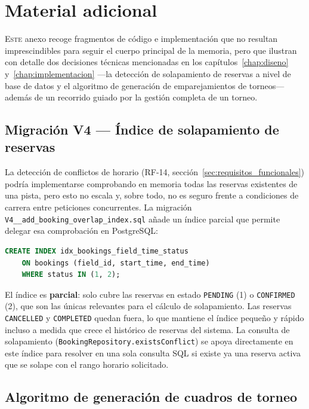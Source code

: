 \chapter{Material adicional}
\label{chap:adicional}

\lettrine{E}{ste} anexo recoge fragmentos de código e implementación que no
resultan imprescindibles para seguir el cuerpo principal de la memoria, pero
que ilustran con detalle dos decisiones técnicas mencionadas en los
capítulos~\ref{chap:diseno} y~\ref{chap:implementacion} —la detección de
solapamiento de reservas a nivel de base de datos y el algoritmo de
generación de emparejamientos de torneos— además de un recorrido guiado por
la gestión completa de un torneo.

\section{Migración V4 — Índice de solapamiento de reservas}
\label{sec:anexo_migracion_v4}

La detección de conflictos de horario (RF-14, sección~\ref{sec:requisitos_funcionales})
podría implementarse comprobando en memoria todas las reservas existentes de
una pista, pero esto no escala y, sobre todo, no es seguro frente a
condiciones de carrera entre peticiones concurrentes. La migración
\texttt{V4\_\_add\_booking\_overlap\_index.sql} añade un índice parcial que
permite delegar esa comprobación en PostgreSQL:

\begin{lstlisting}[language=SQL]
CREATE INDEX idx_bookings_field_time_status
    ON bookings (field_id, start_time, end_time)
    WHERE status IN (1, 2);
\end{lstlisting}

El índice es \textbf{parcial}: solo cubre las reservas en estado
\texttt{PENDING} (1) o \texttt{CONFIRMED} (2), que son las únicas relevantes
para el cálculo de solapamiento. Las reservas \texttt{CANCELLED} y
\texttt{COMPLETED} quedan fuera, lo que mantiene el índice pequeño y rápido
incluso a medida que crece el histórico de reservas del sistema. La consulta
de solapamiento (\texttt{BookingRepository.existsConflict}) se apoya
directamente en este índice para resolver en una sola consulta SQL si existe
ya una reserva activa que se solape con el rango horario solicitado.

\section{Algoritmo de generación de cuadros de torneo}
\label{sec:anexo_bracket_generator}

